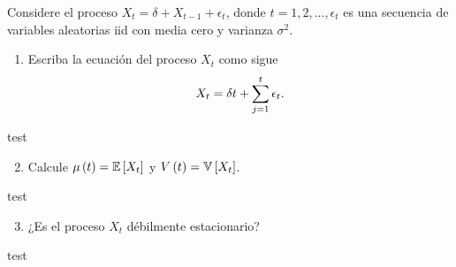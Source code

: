 \documentclass[../main.tex]{subfiles}
\begin{document}
    \begin{enunciado}
        Considere el proceso $X_t = \delta + X_{t-1} + \epsilon_t$, donde $t = 1,2,...,\epsilon_t$ es una secuencia de variables aleatorias iid con media cero y varianza $\sigma^2$.
        \begin{enumerate}
            \item Escriba la ecuación del proceso $X_t$ como sigue
                \begin{align}
                    \label{5:eq}
                	X_t = \delta t + \sum_{j = 1}^{t} \epsilon_t.
                \end{align}
        \end{enumerate}

    \end{enunciado}
    \begin{demostracion}
        test
    \end{demostracion}
    \vspace{1em}
    \begin{enunciado}
    	\begin{enumerate}
            \setcounter{enumi}{1}
    		\item Calcule $\mu\left( t \right) = \mathbb{E} \left[ X_t \right]$ y $V\left( t \right) = \mathbb{V} \left[ X_t \right]$.
    	\end{enumerate}

    \end{enunciado}
    \begin{demostracion}
    	test
    \end{demostracion}
    \vspace{1em}
    \begin{enunciado}
    	\begin{enumerate}
            \setcounter{enumi}{2}
    		\item ¿Es el proceso $X_t$ débilmente estacionario?
    	\end{enumerate}
    \end{enunciado}
    \begin{demostracion}
    	test
    \end{demostracion}
\end{document}
